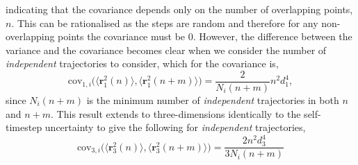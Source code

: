 \documentclass[reprint,superscriptaddress,nobibnotes,amsmath,amssymb,aps,onecolumn]{revtex4-2}
\begin{document}
%
indicating that the covariance depends only on the number of overlapping points, $n$. 
This can be rationalised as the steps are random and therefore for any non-overlapping points the covariance must be \num{0}.
However, the difference between the variance and the covariance becomes clear when we consider the number of \emph{independent} trajectories to consider, which for the covariance is,
%
\begin{equation}
    \mathrm{cov}_{1,i}\Big(\big\langle \mathbf{r}_1^2(n) \big\rangle, \big\langle \mathbf{r}_1^2(n+m) \big\rangle\Big) = \frac{2}{N_i(n+m)}n^2d_1^4,
\end{equation}
%
since $N_i(n+m)$ is the minimum number of \emph{independent} trajectories in both $n$ and $n+m$. 
This result extends to three-dimensions identically to the self-timestep uncertainty to give the following for \emph{independent} trajectories, 
%
\begin{equation}
    \mathrm{cov}_{3,i}\Big(\big\langle \mathbf{r}_3^2(n) \big\rangle, \big\langle \mathbf{r}_3^2(n+m) \big\rangle\Big) = \frac{2n^2d_3^4}{3N_i(n+m)}
    \label{equ:icov}
\end{equation}
%



\end{document}
